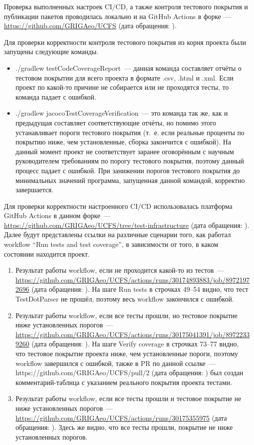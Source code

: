 \documentclass[a4paper]{article}
\begin{document}
Проверка выполненных настроек CI/CD, а также контроля тестового покрытия и публикации пакетов проводилась локально и на GitHub Actions в форке~--- \url{https://github.com/GRIGAeo/UCFS} (дата обращения: ).

Для проверки корректности контроля тестового покрытия из корня проекта были запущены следующие команды.
\begin{itemize}
    \item ./gradlew testCodeCoverageReport~--- данная команда составляет отчёты о тестовом покрытии для всего проекта в формате .csv, .html и .xml. Если проект по какой-то причине не собирается или не проходятся тесты, то команда падает с ошибкой.
    \item ./gradlew jacocoTestCoverageVerification~--- это команда так же, как и предыдущая составляет соответствующие отчёты, но помимо этого устанавливает пороги тестового покрытия (т.~е. если реальные проценты по покрытию ниже, чем установленные, сборка закончится с ошибкой). На данный момент проект не соответствует заранее оговорённым с научным руководителем требованиям по порогу тестового покрытия, поэтому данный процесс падает с ошибкой. При занижении порогов тестового покрытия до минимальных значений программа, запущенная данной командой, корректно завершается.
\end{itemize}

Для проверки корректности настроенного CI/CD использовалась платформа GitHub Actions в данном форке~--- \url{https://github.com/GRIGAeo/UCFS/tree/test-infrastructure} (дата обращения: ). Далее будут представлены ссылки на различные сценарии того, как работал workflow \foreignquote{english}{Run tests and test coverage}, в зависимости от того, в каком состоянии находится проект.

\begin{enumerate}
    \item Результат работы workflow, если не проходится какой-то из тестов~--- \url{https://github.com/GRIGAeo/UCFS/actions/runs/30174893883/job/89721972696} (дата обращения: ). На шаге Run tests в строчках 49--54 видно, что тест TestDotParser не прошёл, поэтому весь workflow закончился с ошибкой.
    \item Результат работы workflow, если все тесты прошли, но тестовое покрытие ниже установленных порогов~--- \url{https://github.com/GRIGAeo/UCFS/actions/runs/30175041391/job/89722339260} (дата обращения: ). На шаге Verify coverage в строчках 73--77 видно, что тестовое покрытие проекта ниже, чем установленные пороги, поэтому workflow завершился с ошибкой, также в PR по данной ссылке~--- https://github.com/GRIGAeo/UCFS/pull/2 (дата обращения: ) был создан комментарий-таблица с указанием реального покрытия проекта тестами.
    \item Результат работы workflow, если все тесты прошли и тестовое покрытие не ниже установленных порогов~--- \url{https://github.com/GRIGAeo/UCFS/actions/runs/30175355975} (дата обращения: ). Здесь же видно, что все тесты прошли, покрытие не ниже установленных порогов.
\end{enumerate}
\end{document}
